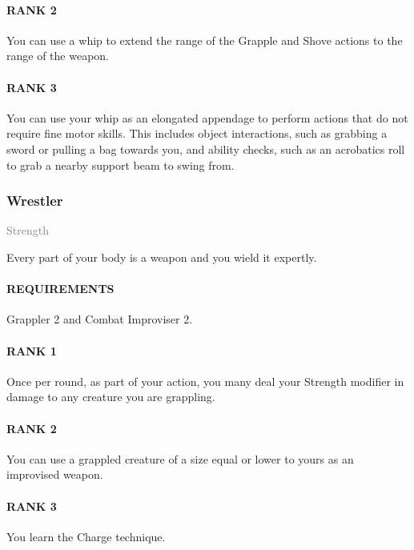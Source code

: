 \paragraph{RANK 2} You can use a whip to extend the range of the Grapple and Shove actions to the range of the weapon.
\paragraph{RANK 3} You can use your whip as an elongated appendage to perform actions that do not require fine motor skills.
This includes object interactions, such as grabbing a sword or pulling a bag towards you, and ability checks, such as an acrobatics roll to grab a nearby support beam to swing from.

\subsubsection{Wrestler} \label{feat::wrestler}
\small{\textcolor{gray}{Strength}}

\normalsize
Every part of your body is a weapon and you wield it expertly.
\paragraph{REQUIREMENTS} Grappler 2 and Combat Improviser 2.
\paragraph{RANK 1} Once per round, as part of your action, you many deal your Strength modifier in damage to any creature you are grappling.
\paragraph{RANK 2} You can use a grappled creature of a size equal or lower to yours as an improvised weapon.
\paragraph{RANK 3} You learn the Charge technique.


